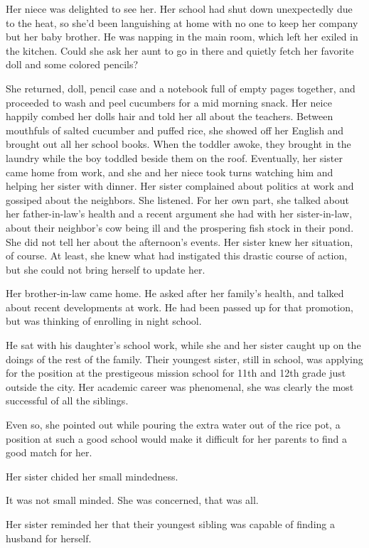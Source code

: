 \documentclass{article}
\begin{document}
Her niece was delighted to see her. Her school had shut down unexpectedly due to the heat, so she'd been languishing at home with no one to keep her company but her baby brother. He was napping in the main room, which left her exiled in the kitchen. Could she ask her aunt to go in there and quietly fetch her favorite doll and some colored pencils?

She returned, doll, pencil case and a notebook full of empty pages together, and proceeded to wash and peel cucumbers for a mid morning snack. Her neice happily combed her dolls hair and told her all about the teachers. Between mouthfuls of salted cucumber and puffed rice, she showed off her English and brought out all her school books. When the toddler awoke, they brought in the laundry while the boy toddled beside them on the roof. Eventually, her sister came home from work, and she and her niece took turns watching him and helping her sister with dinner. Her sister complained about politics at work and gossiped about the neighbors. She listened. For her own part, she talked about her father-in-law's health and a recent argument she had with her sister-in-law, about their neighbor's cow being ill and the prospering fish stock in their pond. She did not tell her about the afternoon's events. Her sister knew her situation, of course. At least, she knew what had instigated this drastic course of action, but she could not bring herself to update her.

Her brother-in-law came home. He asked after her family's health, and talked about recent developments at work. He had been passed up for that promotion, but was thinking of enrolling in night school. 

He sat with his daughter's school work, while she and her sister caught up on the doings of the rest of the family. Their youngest sister, still in school, was applying for the position at the prestigeous mission school for 11th and 12th grade just outside the city. Her academic career was phenomenal, she was clearly the most successful of all the siblings. 

Even so, she pointed out while pouring the extra water out of the rice pot, a position at such a good school would make it difficult for her parents to find a good match for her. 

Her sister chided her small mindedness. 

It was not small minded. She was concerned, that was all. 

Her sister reminded her that their youngest sibling was capable of finding a husband for herself. 
\end{document}
